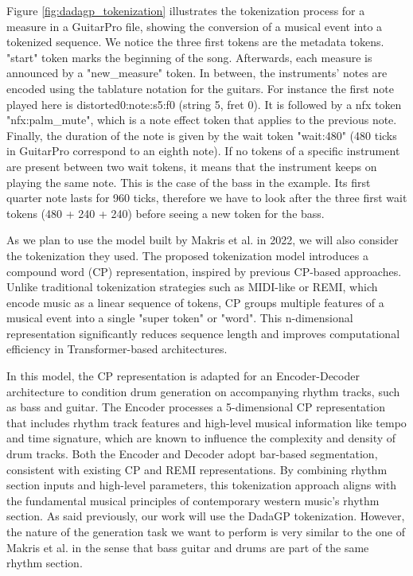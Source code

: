 Figure \ref{fig:dadagp_tokenization} illustrates the tokenization process for a measure in a GuitarPro file, showing the conversion of a musical event into a tokenized sequence.
We notice the three first tokens are the metadata tokens. "start" token marks the beginning of the song.
Afterwards, each measure is announced by a "new\_measure" token.
In between, the instruments' notes are encoded using the tablature notation for the guitars.
For instance the first note played here is distorted0:note:s5:f0 (string 5, fret 0).
It is followed by a nfx token "nfx:palm\_mute", which is a note effect token that applies to the previous note.
Finally, the duration of the note is given by the wait token "wait:480" (480 ticks in GuitarPro correspond to an eighth note).
If no tokens of a specific instrument are present between two wait tokens, it means that the instrument keeps on playing the same note.
This is the case of the bass in the example.
Its first quarter note lasts for 960 ticks, therefore we have to look after the three first wait tokens (480 + 240 + 240) before seeing a new token for the bass.


As we plan to use the model built by Makris et al. in 2022, we will also consider the tokenization they used.
The proposed tokenization model introduces a compound word (CP) representation, inspired by previous CP-based approaches\cite{hsiao_compound_2021}.
Unlike traditional tokenization strategies such as MIDI-like or REMI, which encode music as a linear sequence of tokens, CP groups multiple features of a musical event into a single "super token" or "word".
This n-dimensional representation significantly reduces sequence length and improves computational efficiency in Transformer-based architectures\cite{makris_conditional_2022}.


In this model, the CP representation is adapted for an Encoder-Decoder architecture to condition drum generation on accompanying rhythm tracks, such as bass and guitar.
The Encoder processes a 5-dimensional CP representation that includes rhythm track features and high-level musical information like tempo and time signature, which are known to influence the complexity and density of drum tracks.
Both the Encoder and Decoder adopt bar-based segmentation, consistent with existing CP and REMI representations.
By combining rhythm section inputs and high-level parameters, this tokenization approach aligns with the fundamental musical principles of contemporary western music's rhythm section\cite{makris_conditional_2022}.
As said previously, our work will use the DadaGP tokenization. However, the nature of the generation task we want to perform is very similar to the one of Makris et al. in the sense that bass guitar and drums are part of the same rhythm section.


